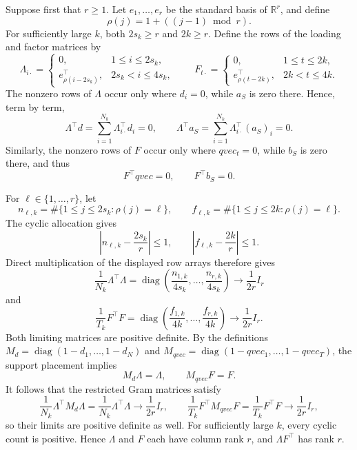 Suppose first that \(r\ge1\). Let \(e_1,\ldots,e_r\) be the standard basis of \(\mathbb R^r\), and define
\[
 \rho(j)=1+((j-1)\bmod r).
\]
For sufficiently large \(k\), both \(2s_k\ge r\) and \(2k\ge r\). Define the rows of the loading and factor matrices by
\[
 \Lambda_{i\cdot}=
 \begin{cases}
  0,&1\le i\le2s_k,\\
  e_{\rho(i-2s_k)}^{\top},&2s_k<i\le4s_k,
 \end{cases}
 \qquad
 F_{t\cdot}=
 \begin{cases}
  0,&1\le t\le2k,\\
  e_{\rho(t-2k)}^{\top},&2k<t\le4k.
 \end{cases}
\]
The nonzero rows of \(\Lambda\) occur only where \(d_i=0\), while \(a_S\) is zero there. Hence, term by term,
\[
 \Lambda^{\top}d
 =\sum_{i=1}^{N_k}\Lambda_{i\cdot}^{\top}d_i=0,
 \qquad
 \Lambda^{\top}a_S
 =\sum_{i=1}^{N_k}\Lambda_{i\cdot}^{\top}(a_S)_i=0.
\]
Similarly, the nonzero rows of \(F\) occur only where \(qvec_t=0\), while \(b_S\) is zero there, and thus
\[
 F^{\top}qvec=0,
 \qquad
 F^{\top}b_S=0.
\]

For \(\ell\in\{1,\ldots,r\}\), let
\[
 n_{\ell,k}=\#\{1\le j\le2s_k:\rho(j)=\ell\},
 \qquad
 f_{\ell,k}=\#\{1\le j\le2k:\rho(j)=\ell\}.
\]
The cyclic allocation gives
\[
 \left|n_{\ell,k}-\frac{2s_k}{r}\right|\le1,
 \qquad
 \left|f_{\ell,k}-\frac{2k}{r}\right|\le1.
\]
Direct multiplication of the displayed row arrays therefore gives
\[
 \frac{1}{N_k}\Lambda^{\top}\Lambda
 =\operatorname{diag}\!\left(
   \frac{n_{1,k}}{4s_k},\ldots,\frac{n_{r,k}}{4s_k}
  \right)
 \longrightarrow \frac{1}{2r}I_r
\]
and
\[
 \frac{1}{T_k}F^{\top}F
 =\operatorname{diag}\!\left(
   \frac{f_{1,k}}{4k},\ldots,\frac{f_{r,k}}{4k}
  \right)
 \longrightarrow \frac{1}{2r}I_r.
\]
Both limiting matrices are positive definite. By the definitions \(M_d=\operatorname{diag}(1-d_1,\ldots,1-d_N)\) and \(M_{qvec}=\operatorname{diag}(1-qvec_1,\ldots,1-qvec_T)\), the support placement implies
\[
 M_d\Lambda=\Lambda,
 \qquad
 M_{qvec}F=F.
\]
It follows that the restricted Gram matrices satisfy
\[
 \frac{1}{N_k}\Lambda^{\top}M_d\Lambda
 =\frac{1}{N_k}\Lambda^{\top}\Lambda
 \longrightarrow\frac{1}{2r}I_r,
 \qquad
 \frac{1}{T_k}F^{\top}M_{qvec}F
 =\frac{1}{T_k}F^{\top}F
 \longrightarrow\frac{1}{2r}I_r,
\]
so their limits are positive definite as well. For sufficiently large \(k\), every cyclic count is positive. Hence \(\Lambda\) and \(F\) each have column rank \(r\), and \(\Lambda F^{\top}\) has rank \(r\).

